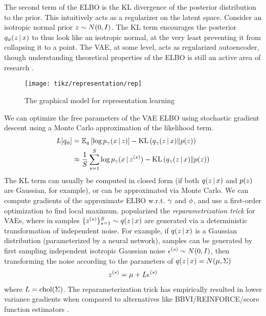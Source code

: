 The second term of the ELBO is the KL divergence of the posterior distribution to the prior. This intuitively acts as
a regularizer on the latent space. Consider
an isotropic normal prior $z \sim N(0, I)$. The KL
term encourages the posterior $q_\phi(z \,|\, x)$
to thus look like an isotropic normal, 
at the very least preventing it from collapsing it to
a point. 
The VAE, at some level, acts as regularized autoencoder, though understanding theoretical properties of the ELBO
is still an active area of research \citep{Burda2015, Hoffman2016, Alemi2017}.

\begin{figure}[htp!]
    \centering
    \texttt{[image: tikz/representation/rep]}
    \caption{The graphical model for representation learning}
    \label{fig:graphical-model-rep}
\end{figure}

We can optimize the free parameters of the VAE ELBO
using stochastic gradient descent
using a Monte Carlo approximation of the likelihood term.
\begin{align*}
L[q_\phi] &= \mathbb{E}_q \left[ \log p_\gamma(x \,|\, z)\right] - \mathrm{KL}\left(q_\gamma(z \,|\, x)\|p(z)\right) \\
                 &\approx \frac{1}{S}\sum_{s = 1}^S \log p_\gamma(x \,|\, z^{(s)}) - \mathrm{KL}\left(q_\gamma(z \,|\, x)\|p(z)\right)
\end{align*}
The KL term can usually be computed in closed form (if both $q(z \,|\, x)$ and $p(z)$ are Gaussian, for example), or can be approximated
via Monte Carlo. We can compute gradients of the approximate
ELBO w.r.t. $\gamma$ and $\phi$, and use a
first-order optimization to find local maximum. \citet{Kingma2013}
popularized the \emph{reparametrization trick} for VAEs,
where in samples $\{z^{(s)}\}_{s = 1}^S \sim q(z \,|\, x)$ are generated
via a deterministic transformation of independent noise.
For example, if $q(z \,|\, x)$ is a Gaussian distribution (parameterized
by a neural network), samples can be generated
by first sampling independent isotropic Gaussian noise $\epsilon^{(s)} \sim N(0, I)$, then transforming the noise according to the parameters
of $q(z \,|\, x) = N(\mu, \Sigma)$
\begin{align*}
    z^{(s)} = \mu + L\epsilon^{(s)}
\end{align*}
where $L = \mathrm{chol}(\Sigma)$. The reparameterization trick
has empirically resulted in lower variance gradients
when compared to alternatives
like BBVI/REINFORCE/score function estimators \citep{Ranganath2014, Williams1992}.

